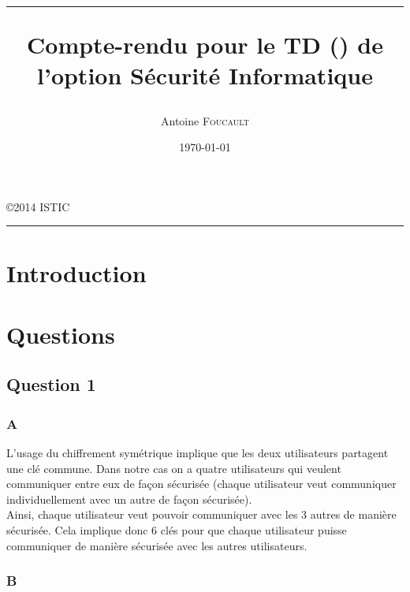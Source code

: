 \documentclass[a4paper, 11pt, oneside]{article}
\title{\hrule \vspace{1cm} Compte-rendu pour le TD (\no2) de l'option Sécurité Informatique}
\author{Antoine \textsc{Foucault}}
\date{\today}
\begin{document}
\pagestyle{fancy}
\lhead{}
\chead{}
\rhead{\leftmark}
\cfoot{}

\clearpage
\thispagestyle{empty}

\maketitle
\begin{center}
 \copyright 2014 ISTIC\\
\end{center}
\vspace{1cm}
\hrule
\thispagestyle{empty}

\newpage

\renewcommand{\contentsname}{Sommaire}
\tableofcontents
\thispagestyle{empty}
\newpage
\setcounter{page}{1}

\section*{Introduction}



\section{Questions}

\subsection{Question 1}

\subsubsection{A}

L'usage du chiffrement symétrique implique que les deux utilisateurs partagent une clé commune. Dans notre cas on a quatre utilisateurs qui veulent communiquer entre eux de façon sécurisée (chaque utilisateur veut communiquer individuellement avec un autre de façon sécurisée).\\
Ainsi, chaque utilisateur veut pouvoir communiquer avec les 3 autres de manière sécurisée. Cela implique donc 6 clés pour que chaque utilisateur puisse communiquer de manière sécurisée avec les autres utilisateurs.

\subsubsection{B}
\end{document}
